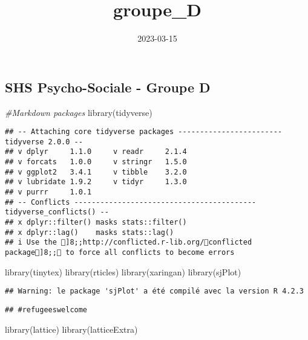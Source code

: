\documentclass[
]{article}
\title{groupe\_D}
\author{}
\date{\vspace{-2.5em}2023-03-15}
\newenvironment{Shaded}{\begin{snugshade}}{\end{snugshade}}
\newcommand{\CommentTok}[1]{\textcolor[rgb]{0.56,0.35,0.01}{\textit{#1}}}
\newcommand{\FunctionTok}[1]{\textcolor[rgb]{0.00,0.00,0.00}{#1}}
\newcommand{\NormalTok}[1]{#1}
\begin{document}
\maketitle

\hypertarget{shs-psycho-sociale---groupe-d}{%
\subsection{SHS Psycho-Sociale - Groupe
D}\label{shs-psycho-sociale---groupe-d}}

\begin{Shaded}
\begin{Highlighting}[]
\CommentTok{\#Markdown packages}
\FunctionTok{library}\NormalTok{(tidyverse)}
\end{Highlighting}
\end{Shaded}

\begin{verbatim}
## -- Attaching core tidyverse packages ------------------------ tidyverse 2.0.0 --
## v dplyr     1.1.0     v readr     2.1.4
## v forcats   1.0.0     v stringr   1.5.0
## v ggplot2   3.4.1     v tibble    3.2.0
## v lubridate 1.9.2     v tidyr     1.3.0
## v purrr     1.0.1     
## -- Conflicts ------------------------------------------ tidyverse_conflicts() --
## x dplyr::filter() masks stats::filter()
## x dplyr::lag()    masks stats::lag()
## i Use the ]8;;http://conflicted.r-lib.org/conflicted package]8;; to force all conflicts to become errors
\end{verbatim}

\begin{Shaded}
\begin{Highlighting}[]
\FunctionTok{library}\NormalTok{(tinytex)}
\FunctionTok{library}\NormalTok{(rticles)}
\FunctionTok{library}\NormalTok{(xaringan)}
\FunctionTok{library}\NormalTok{(sjPlot)}
\end{Highlighting}
\end{Shaded}

\begin{verbatim}
## Warning: le package 'sjPlot' a été compilé avec la version R 4.2.3
\end{verbatim}

\begin{verbatim}
## #refugeeswelcome
\end{verbatim}

\begin{Shaded}
\begin{Highlighting}[]
\FunctionTok{library}\NormalTok{(lattice)}
\FunctionTok{library}\NormalTok{(latticeExtra)}
\end{Highlighting}
\end{Shaded}
\end{document}

